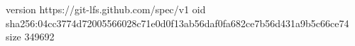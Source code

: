 version https://git-lfs.github.com/spec/v1
oid sha256:04cc3774d72005566028c71e0d0f13ab56daf0fa682ce7b56d431a9b5c66ce74
size 349692
